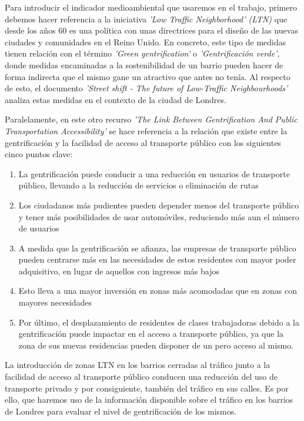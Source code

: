 \documentclass[12pt,a4paper,twoside]{book}
\begin{document}
Para introducir el indicador medioambiental que usaremos en el trabajo, primero debemos hacer referencia a la iniciativa \textit{'Low Traffic Neighborhood' (LTN)} que desde los años 60 es una política con unas directrices para el diseño de las nuevas ciudades y comunidades en el Reino Unido. En concreto, este tipo de medidas tienen relación con el término \textit{'Green gentrification'} o \textit{'Gentrificación verde'}, donde medidas encaminadas a la sostenibilidad de un barrio pueden hacer de forma indirecta que el mismo gane un atractivo que antes no tenía. Al respecto de esto, el documento \textit{'Street shift - The future of Low-Traffic Neighbourhoods'} \cite{bosetti_street_2022} analiza estas medidas en el contexto de la ciudad de Londres.

Paralelamente, en este otro recurso \textit{'The Link Between Gentrification And Public Transportation Accessibility'} \cite{fastercapital_link_nodate} se hace referencia a la relación que existe entre la gentrificación y la facilidad de acceso al transporte público con los siguientes cinco puntos clave:
\begin{enumerate}
    \item La gentrificación puede conducir a una reducción en usuarios de transporte público, llevando a la reducción de servicios o eliminación de rutas
    \item Los ciudadanos más pudientes pueden depender menos del transporte público y tener más posibilidades de usar automóviles, reduciendo más aun el número de usuarios
    \item A medida que la gentrificación se afianza, las empresas de transporte público pueden centrarse más en las necesidades de estos residentes con mayor poder adquisitivo, en lugar de aquellos con ingresos más bajos
    \item Esto lleva a una mayor inversión en zonas más acomodadas que en zonas con mayores necesidades
    \item Por último, el desplazamiento de residentes de clases trabajadoras debido a la gentrificación puede impactar en el acceso a transporte público, ya que la zona de sus nuevas residencias pueden disponer de un pero acceso al mismo.
\end{enumerate}

La introducción de zonas LTN en los barrios cerradas al tráfico junto a la facilidad de acceso al transporte público conducen una reducción del uso de transporte privado y por consiguiente, también del tráfico en sus calles. Es por ello, que haremos uso de la información disponible sobre el tráfico en los barrios de Londres para evaluar el nivel de gentrificación de los mismos.
\end{document}
